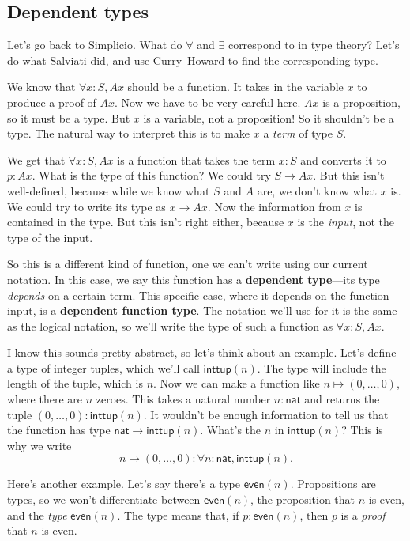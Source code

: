 \documentclass[11pt,paper=letter]{scrartcl}
\newcommand{\sf}{\mathsf}
\begin{document}
\subsection{Dependent types}

Let's go back to Simplicio. What do $\forall$ and $\exists$ correspond to in type theory? Let's do what Salviati did, and use Curry--Howard to find the corresponding type.

We know that $\forall x:S, Ax$ should be a function. It takes in the variable $x$ to produce a proof of $Ax$. Now we have to be very careful here. $Ax$ is a proposition, so it must be a type. But $x$ is a variable, not a proposition! So it shouldn't be a type. The natural way to interpret this is to make $x$ a \emph{term} of type $S$.

We get that $\forall x: S, Ax$ is a function that takes the term $x : S$ and converts it to $p : Ax$. What is the type of this function? We could try $S \to Ax$. But this isn't well-defined, because while we know what $S$ and $A$ are, we don't know what $x$ is. We could try to write its type as $x \to Ax$. Now the information from $x$ is contained in the type. But this isn't right either, because $x$ is the \emph{input}, not the type of the input.

So this is a different kind of function, one we can't write using our current notation. In this case, we say this function has a \textbf{dependent type}---its type \emph{depends} on a certain term. This specific case, where it depends on the function input, is a \textbf{dependent function type}. The notation we'll use for it is the same as the logical notation, so we'll write the type of such a function as $\forall x: S, Ax$.

I know this sounds pretty abstract, so let's think about an example. Let's define a type of integer tuples, which we'll call $\sf{inttup}(n)$. The type will include the length of the tuple, which is $n$. Now we can make a function like $n \mapsto (0, \ldots, 0)$, where there are $n$ zeroes. This takes a natural number $n : \sf{nat}$ and returns the tuple $(0, \ldots, 0) : \sf{inttup}(n)$. It wouldn't be enough information to tell us that the function has type $\sf{nat} \to \sf{inttup}(n)$. What's the $n$ in $\sf{inttup}(n)$? This is why we write \[
  n \mapsto (0, \ldots, 0) : \forall n: \sf{nat}, \sf{inttup}(n).
\]

Here's another example. Let's say there's a type $\sf{even}(n)$. Propositions are types, so we won't differentiate between $\sf{even}(n)$, the proposition that $n$ is even, and the \emph{type} $\sf{even}(n)$. The type means that, if $p : \sf{even}(n)$, then $p$ is a \emph{proof} that $n$ is even.
\end{document}
